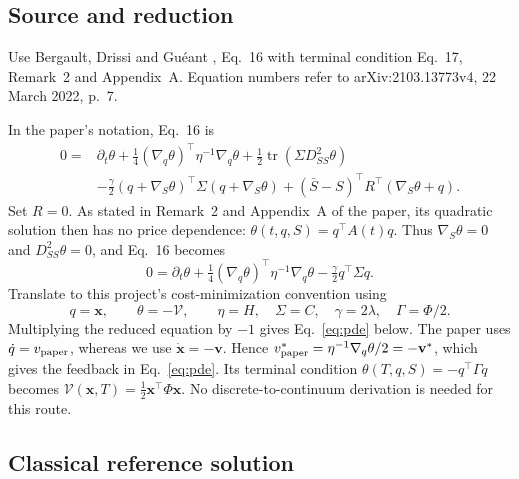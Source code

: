\subsection*{Source and reduction}

Use Bergault, Drissi and Gu\'eant \cite{bergault2022}, Eq.~16 with terminal
condition Eq.~17, Remark~2 and Appendix~A. Equation numbers refer to
arXiv:2103.13773v4, 22 March 2022, p.~7.

In the paper's notation, Eq.~16 is
\begin{equation}
\begin{aligned}
0={}&\partial_t\theta
 +\tfrac14(\nabla_q\theta)^\top\eta^{-1}\nabla_q\theta
 +\tfrac12\operatorname{tr}(\Sigma D^2_{SS}\theta)\\
 &-\tfrac\gamma2(q+\nabla_S\theta)^\top\Sigma(q+\nabla_S\theta)
 +(\bar S-S)^\top R^\top(\nabla_S\theta+q).
\end{aligned}
\label{eq:bdg16}
\end{equation}
Set $R=0$. As stated in Remark~2 and Appendix~A of the paper, its quadratic
solution then has no price dependence: $\theta(t,q,S)=q^\top A(t)q$.
Thus $\nabla_S\theta=0$ and $D^2_{SS}\theta=0$, and Eq.~16 becomes
\[
0=\partial_t\theta+\tfrac14(\nabla_q\theta)^\top\eta^{-1}\nabla_q\theta
       -\tfrac\gamma2q^\top\Sigma q.
\]
Translate to this project's cost-minimization convention using
\[
 q=\mathbf x,\qquad \theta=-\mathcal V,\qquad
 \eta=H,\quad\Sigma=C,\quad\gamma=2\lambda,\quad\Gamma=\Phi/2.
\]
Multiplying the reduced equation by $-1$ gives Eq.~\eqref{eq:pde} below.
The paper uses $\dot q=v_{\rm paper}$, whereas we use
$\dot{\mathbf x}=-\mathbf v$. Hence
$v_{\rm paper}^*=\eta^{-1}\nabla_q\theta/2=-\mathbf v^*$, which gives
the feedback in Eq.~\eqref{eq:pde}. Its terminal condition
$\theta(T,q,S)=-q^\top\Gamma q$ becomes
$\mathcal V(\mathbf x,T)=\tfrac12\mathbf x^\top\Phi\mathbf x$.
No discrete-to-continuum derivation is needed for this route.

\subsection*{Classical reference solution}


